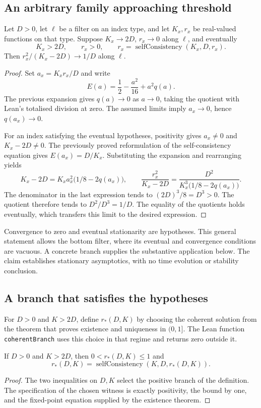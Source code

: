 \subsection{An arbitrary family approaching threshold}
\begin{claim}
Let $D>0$, let $\ell$ be a filter on an index type, and let $K_x,r_x$ be
real-valued functions on that type. Suppose $K_x\to2D$, $r_x\to0$ along
$\ell$, and eventually
\[
 K_x>2D,\qquad r_x>0,\qquad
 r_x=\operatorname{selfConsistency}(K_x,D,r_x).
\]
Then $r_x^2/(K_x-2D)\to1/D$ along $\ell$.
\end{claim}
\begin{proof}
Set $a_x=K_xr_x/D$ and write
\[
 E(a)=\frac12-\frac{a^2}{16}+a^2q(a).
\]
The previous expansion gives $q(a)\to0$ as $a\to0$, taking the quotient
with Lean's totalised division at zero. The assumed limits imply $a_x\to0$,
hence $q(a_x)\to0$.

For an index satisfying the eventual hypotheses, positivity gives
$a_x\ne0$ and $K_x-2D\ne0$. The previously proved reformulation of the
self-consistency equation gives $E(a_x)=D/K_x$. Substituting the expansion
and rearranging yields
\[
 K_x-2D=K_xa_x^2\bigl(1/8-2q(a_x)\bigr),\qquad
 \frac{r_x^2}{K_x-2D}
 =\frac{D^2}{K_x^3\bigl(1/8-2q(a_x)\bigr)}.
\]
The denominator in the last expression tends to
$(2D)^3/8=D^3>0$. The quotient therefore tends to $D^2/D^3=1/D$.
The equality of the quotients holds eventually, which transfers this limit
to the desired expression.
\end{proof}
\scope Convergence to zero and eventual stationarity are hypotheses. This
general statement allows the bottom filter, where its eventual and convergence
conditions are vacuous. A concrete branch supplies the substantive application
below. The claim establishes stationary asymptotics, with no time evolution
or stability conclusion.

\subsection{A branch that satisfies the hypotheses}
For $D>0$ and $K>2D$, define $r_*(D,K)$ by choosing the coherent solution from
the theorem that proves existence and uniqueness in $(0,1]$.
The Lean function \texttt{coherentBranch} uses this choice in that regime
and returns zero outside it.

\begin{claim}
If $D>0$ and $K>2D$, then $0<r_*(D,K)\leq1$ and
\[
r_*(D,K)=\operatorname{selfConsistency}(K,D,r_*(D,K)).
\]
\end{claim}
\begin{proof}
The two inequalities on $D,K$ select the positive branch of the definition.
The specification of the chosen witness is exactly positivity, the bound by
one, and the fixed-point equation supplied by the existence theorem.
\end{proof}


